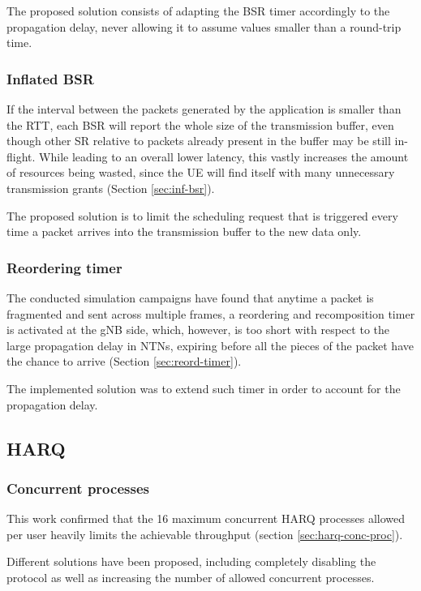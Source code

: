 The proposed solution consists of adapting the \ac{BSR} timer accordingly to the propagation delay, never allowing it to assume values smaller than a round-trip time. 

\subsubsection{Inflated BSR}
If the interval between the packets generated by the application is smaller than the \ac{RTT}, each \ac{BSR} will report the whole size of the transmission buffer, even though other \ac{SR} relative to packets already present in the buffer may be still in-flight. While leading to an overall lower latency, this vastly increases the amount of resources being wasted, since the \ac{UE} will find itself with many unnecessary transmission grants (Section \ref{sec:inf-bsr}).

The proposed solution is to limit the scheduling request that is triggered every time a packet arrives into the transmission buffer to the new data only.

\subsubsection{Reordering timer}
The conducted simulation campaigns have found that anytime a packet is fragmented and sent across multiple frames, a reordering and recomposition timer is activated at the \ac{gNB} side, which, however, is too short with respect to the large propagation delay in \ac{NTN}s, expiring before all the pieces of the packet have the chance to arrive (Section \ref{sec:reord-timer}).

The implemented solution was to extend such timer in order to account for the propagation delay.

\subsection{HARQ}
\subsubsection{Concurrent processes}
This work confirmed that the 16 maximum concurrent \ac{HARQ} processes allowed per user heavily limits the achievable throughput (section \ref{sec:harq-conc-proc}).

Different solutions have been proposed, including completely disabling the protocol as well as increasing the number of allowed concurrent processes.

